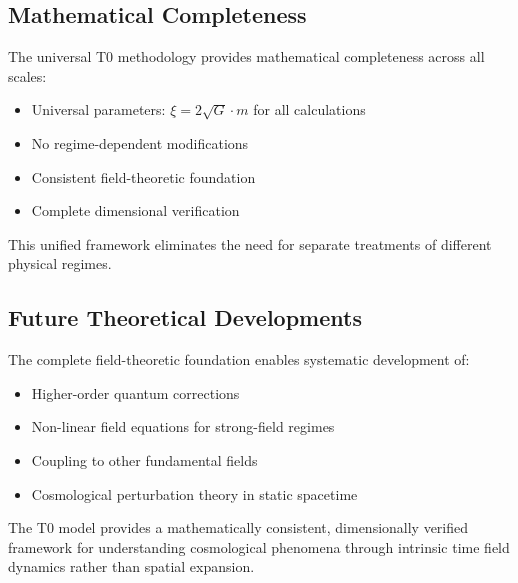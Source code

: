 \documentclass[12pt,a4paper]{article}
\begin{document}
	\subsection{Mathematical Completeness}
	\label{subsec:mathematical_completeness}
	
	The universal T0 methodology provides mathematical completeness across all scales:
	
	\begin{itemize}
		\item Universal parameters: $\xi = 2\sqrt{G} \cdot m$ for all calculations
		\item No regime-dependent modifications
		\item Consistent field-theoretic foundation
		\item Complete dimensional verification
	\end{itemize}
	
	This unified framework eliminates the need for separate treatments of different physical regimes.
	
	\subsection{Future Theoretical Developments}
	\label{subsec:future_theory}
	
	The complete field-theoretic foundation enables systematic development of:
	\begin{itemize}
		\item Higher-order quantum corrections
		\item Non-linear field equations for strong-field regimes  
		\item Coupling to other fundamental fields
		\item Cosmological perturbation theory in static spacetime
	\end{itemize}
	
	The T0 model provides a mathematically consistent, dimensionally verified framework for understanding cosmological phenomena through intrinsic time field dynamics rather than spatial expansion.
	
\end{document}
